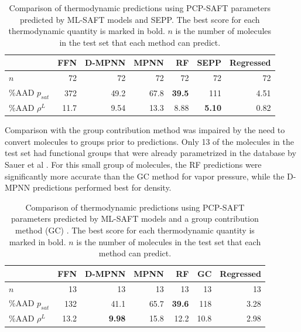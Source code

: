 \begin{table}
	\caption{Comparison of thermodynamic predictions using PCP-SAFT parameters predicted by ML-SAFT models and SEPP.\cite{Kaminski2020} The best score for each thermodynamic quantity is marked in bold. $n$ is the number of molecules in the test set that each method can predict.}
        \label{tab:sepp}
	\begin{center}
        \begin{tabular}{lrrrrr|r}
            & FFN & D-MPNN & MPNN & RF & SEPP & Regressed \\
            \hline
            $n$ & 72 & 72 & 72 & 72 & 72 & 72 \\
            \%AAD $p_{sat}$ & 372 & 49.2 & 67.8 & \textbf{39.5} & 111 & 4.51 \\
            \%AAD $\rho^{L}$ & 11.7 & 9.54 & 13.3 & 8.88 &\textbf{5.10} & 0.82 \\
        \end{tabular}
	\end{center}
\end{table}

Comparison with the group contribution method was impaired by the need to convert molecules to groups prior to predictions. Only 13 of the molecules in the test set had functional groups that were already parametrized in the database by Sauer et al \cite{Sauer2014}. For this small group of molecules, the RF predictions were significantly more accurate than the GC method for vapor pressure, while the D-MPNN predictions performed best for density. 


\begin{table}
	\caption{Comparison of thermodynamic predictions using PCP-SAFT parameters predicted by ML-SAFT models and a group contribution method (GC) \cite{Sauer2014}. The best score for each thermodynamic quantity  is marked in bold. $n$ is the number of molecules in the test set that each method can predict.}
    \label{tab:gc}
	\begin{center}
		\begin{tabular}{lrrrrr|r}
			 & FFN & D-MPNN & MPNN & RF & GC & Regressed \\
			\hline
			$n$ & 13 & 13 & 13 & 13 & 13 & 13 \\
			\%AAD $p_{sat}$ & 132 & 41.1 & 65.7 & \textbf{39.6} & 118 & 3.28 \\
			\%AAD $\rho^{L}$ & 13.2 & \textbf{9.98} & 15.8 & 12.2 & 10.8 & 2.98 \\
		\end{tabular}
	\end{center}
\end{table}

